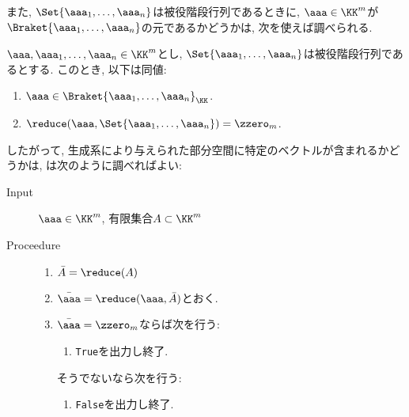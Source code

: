 また,
$\Set{\aaa_1,\ldots,\aaa_n}$は被役階段行列であるときに,
$\aaa\in\KK^m$が$\Braket{\aaa_1,\ldots,\aaa_n}$の元であるかどうかは,
次を使えば調べられる.
\begin{prop}
  \label{prop:subspace:belong:prob}
  $\aaa,\aaa_1,\ldots,\aaa_n\in\KK^m$とし,
  $\Set{\aaa_1,\ldots,\aaa_n}$は被役階段行列であるとする.
  このとき,
  以下は同値:
  \begin{enumerate}
  \item $\aaa\in\Braket{\aaa_1,\ldots,\aaa_n}_{\KK}$.
  \item $\reduce(\aaa,\Set{\aaa_1,\ldots,\aaa_n})=\zzero_m$.
  \end{enumerate}
\end{prop}
したがって,
生成系により与えられた部分空間に特定のベクトルが含まれるかどうかは,
は次のように調べればよい:
\begin{algorithm}\makebox{}
\begin{description}
\item[Input]
 $\aaa\in\KK^m$, 有限集合$A\subset \KK^m$
\item[Proceedure]\makebox{}
  \begin{enumerate}
  \item $\bar A=\reduce(A)$
  \item $\bar\aaa=\reduce(\aaa,\bar A)$とおく.
  \item $\bar\aaa=\zzero_m$ならば次を行う:
    \begin{enumerate}
    \item \texttt{True}を出力し終了.
    \end{enumerate}
  そうでないなら次を行う:
    \begin{enumerate}
    \item \texttt{False}を出力し終了.
    \end{enumerate}
  \end{enumerate}
\end{description}
\end{algorithm}

